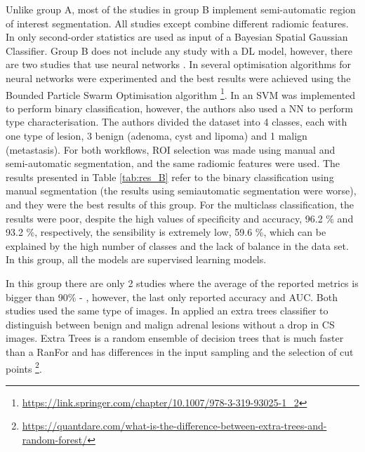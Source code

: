 \documentclass[11pt]{article}
\begin{document}
Unlike group A, most of the studies in group B implement semi-automatic region
of interest segmentation. All studies except \cite{Li2019} combine different
radiomic features. In \cite{Li2019} only second-order statistics are used as
input of a Bayesian Spatial Gaussian Classifier. Group B does not include any
study with a DL model, however, there are two studies that use neural networks \cite{Koyuncu2019,Barstugan2020}.
In \cite{Koyuncu2019} several optimisation algorithms for neural
networks were experimented and the best results were achieved using the Bounded Particle Swarm
Optimisation algorithm \footnote{\href{https://link.springer.com/chapter/10.1007/978-3-319-93025-1\_2}{https://link.springer.com/chapter/10.1007/978-3-319-93025-1\_2}}. In
\cite{Barstugan2020} an SVM was implemented to perform binary classification,
however, the authors also used a NN to perform type characterisation. The
authors divided the dataset into 4 classes, each with one type of lesion, 3
benign (adenoma, cyst and lipoma) and 1 malign (metastasis). For both workflows,
ROI selection was made using manual and semi-automatic segmentation, and the
same radiomic features were used. The results presented in Table \ref{tab:res_B}
refer to the binary classification using manual segmentation (the results using
semiautomatic segmentation were worse),
and they were the best results of this
group. For the multiclass classification, the results were poor, despite the
high values of specificity and accuracy, 96.2 \% and 93.2 \%, respectively, the
sensibility is extremely low, 59.6 \%, which can be explained by the high number
of classes and the lack of balance in the data set. In this group, all the
models are supervised learning models.

In this group there are only 2 studies where the average of the reported metrics
is bigger than 90\% - \cite{Barstugan2020,Stanzione2021}, however, the last only
reported accuracy and AUC. Both studies used the same type of images. In
\cite{Stanzione2021} applied an extra trees classifier to distinguish between
benign and malign adrenal lesions without a drop in CS images. Extra Trees is
a random ensemble of decision trees that is much faster than a RanFor and has
differences in the input sampling and the selection of cut points \footnote{\href{https://quantdare.com/what-is-the-difference-between-extra-trees-and-random-forest/}{https://quantdare.com/what-is-the-difference-between-extra-trees-and-random-forest/}}.
\end{document}

